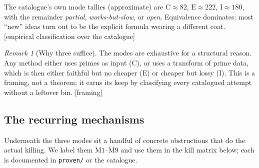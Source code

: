 \documentclass[11pt]{article}
\theoremstyle{plain}
\theoremstyle{definition}
\theoremstyle{remark}
\newtheorem{remark}[theorem]{Remark}
\newcommand{\stat}[1]{\quad\textnormal{\footnotesize\textsf{[\textcolor{accent}{#1}]}}}
\begin{document}
The catalogue's own mode tallies (approximate) are $\mathrm{C}\approx 82$,
$\mathrm{E}\approx 222$, $\mathrm{I}\approx 180$, with the remainder
\emph{partial}, \emph{works-but-slow}, or \emph{open}. Equivalence dominates: most
``new'' ideas turn out to be the explicit formula wearing a different coat.
\stat{empirical classification over the catalogue}

\begin{remark}[Why three suffice]
The modes are exhaustive for a structural reason. Any method either uses primes
as input ($\mathrm{C}$), or uses a transform of prime data, which is then either
faithful but no cheaper ($\mathrm{E}$) or cheaper but lossy ($\mathrm{I}$). This
is a framing, not a theorem; it earns its keep by classifying every catalogued
attempt without a leftover bin.
\stat{framing}
\end{remark}

\subsection{The recurring mechanisms}

Underneath the three modes sit a handful of concrete obstructions that do the
actual killing. We label them $\mathrm{M1}$--$\mathrm{M9}$ and use them in the
kill matrix below; each is documented in \texttt{proven/} or the catalogue.
\end{document}
